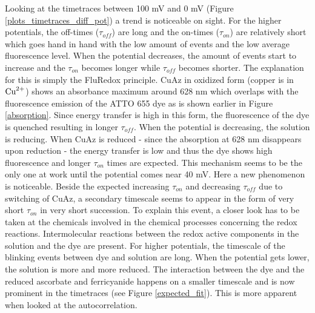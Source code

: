 \documentclass[twoside,single]{lion-msc}
\begin{document}
Looking at the timetraces between 100 mV and 0 mV (Figure \ref{plots_timetraces_diff_pot}) a trend is noticeable on sight. For the higher potentials, the off-times ($\tau_{off}$) are long and the on-times ($\tau_{on}$) are relatively short which goes hand in hand with the low amount of events and the low average fluorescence level. When the potential decreases, the amount of events start to increase and the $\tau_{on}$ becomes longer while $\tau_{off}$ becomes shorter. The explanation for this is simply the FluRedox principle. CuAz in oxidized form (copper is in $\textup{Cu}^{2+}$) shows an absorbance maximum around 628 nm which overlaps with the fluorescence emission of the ATTO 655 dye as is shown earlier in Figure \ref{absorption}. Since energy transfer is high in this form, the fluorescence of the dye is quenched resulting in longer $\tau_{off}$. When the potential is decreasing, the solution is reducing. When CuAz is reduced - since the absorption at 628 nm disappears upon reduction - the energy transfer is low and thus the dye shows high fluorescence and longer $\tau_{on}$ times are expected. This mechanism seems to be the only one at work until the potential comes near 40 mV. Here a new phenomenon is noticeable. Beside the expected  increasing $\tau_{on}$ and decreasing $\tau_{off}$ due to switching of CuAz, a secondary timescale seems to appear in the form of very short $\tau_{on}$ in very short succession. To explain this event, a closer look has to be taken at the chemicals involved in the chemical processes concerning the redox reactions. Intermolecular reactions between the redox active components in the solution and the dye are present. For higher potentials, the timescale of the blinking events between dye and solution are long. When the potential gets lower, the solution is more and more reduced. The interaction between the dye and the reduced ascorbate and ferricyanide happens on a smaller timescale and is now prominent in the timetraces (see Figure \ref{expected_fit}). This is more apparent when looked at the autocorrelation. 
\end{document}
